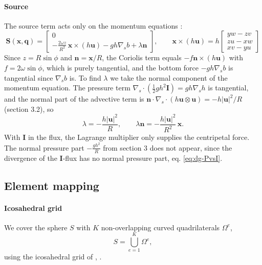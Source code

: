 \paragraph{Source}
The source term acts only on the momentum equations \cite{GIRALDO2002499}:
\begin{equation*}
    \mathbf{S}(\mathbf{x}, \mathbf{q}) =
    \begin{bmatrix}
    0\\
    -\frac{2\omega z}{R^2}\,\mathbf{x}\times(h\mathbf{u}) - gh\nabla_s b + \lambda\mathbf{n}
    \end{bmatrix},
    \qquad
    \mathbf{x}\times(h\mathbf{u}) = h
    \begin{bmatrix}
    yw - zv\\
    zu - xw\\
    xv - yu
    \end{bmatrix}
\end{equation*}
Since $z = R\sin\phi$ and $\mathbf{n} = \mathbf{x}/R$, the Coriolis term equals $-f\mathbf{n}\times(h\mathbf{u})$ with $f = 2\omega\sin\phi$, which is purely tangential, and the bottom force $-gh\nabla_s b$ is tangential since $\nabla_s b$ is. To find $\lambda$ we take the normal component of the momentum equation. The pressure term $\nabla_s\cdot(\frac12gh^2\mathbf{I}) = gh\nabla_s h$ is tangential, and the normal part of the advective term is $\mathbf{n}\cdot\nabla_s\cdot(h\mathbf{u}\otimes\mathbf{u}) = -h|\mathbf{u}|^2/R$ (section 3.2), so
\begin{equation*}
    \lambda = -\frac{h|\mathbf{u}|^2}{R},
    \qquad
    \lambda\mathbf{n} = -\frac{h|\mathbf{u}|^2}{R^2}\,\mathbf{x}.
\end{equation*}
With $\mathbf{I}$ in the flux, the Lagrange multiplier only supplies the centripetal force. The normal pressure part $-\frac{gh^2}{R}$ from section 3 does not appear, since the divergence of the $\mathbf{I}$-flux has no normal pressure part, eq. \eqref{eq:dg-PvsI}.


\subsection{Element mapping}\label{sec:dg-grid}
\paragraph{Icosahedral grid}
We cover the sphere $S$ with $K$ non-overlapping curved quadrilaterals $\Omega^e$,
\begin{equation*}
    S = \bigcup_{e=1}^{K}\Omega^e ,
\end{equation*}
using the icosahedral grid of \cite{GIRALDO2002499}, \cite{bonev2018discontinuous}. 

